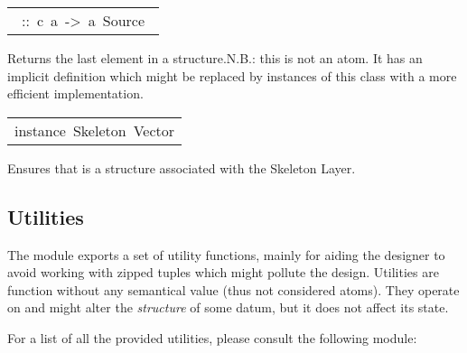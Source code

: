 \begin{haddockdesc}
\begin{haddockdesc}
\item[\begin{tabular}{@{}l}\haddockid{last}\ ::\ c\ a\ ->\ a\ Source\ \end{tabular}]
\haddockbegindoc
Returns the last element in a structure.N.B.: this is not an atom. It has an implicit definition which might be replaced by instances of this class with a more efficient implementation.\par

\end{haddockdesc}


\item[\begin{tabular}{@{}l}
instance\ Skeleton\ Vector
\end{tabular}]\haddockbegindoc
Ensures that  is a structure associated with the Skeleton Layer.\par

\end{haddockdesc}
\subsection{Utilities}
The  module exports a set of utility functions,
 mainly for aiding the designer to avoid working with zipped
 tuples which might pollute the design. Utilities are function
 without any semantical value (thus not considered atoms). They
 operate on and might alter the \emph{structure} of some datum, but it
 does not affect its state.\par
For a list of all the provided utilities, please consult the
 following module:\par

